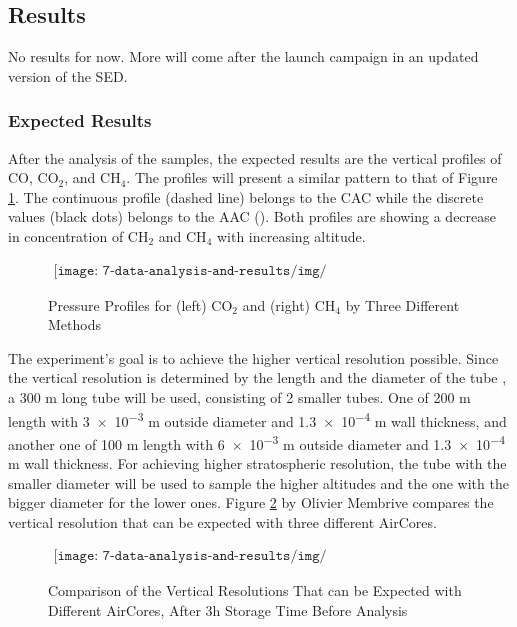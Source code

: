 \subsection{Results}

No results for now. More will come after the launch campaign in an updated version of the SED. 

\subsubsection{Expected Results}

After the analysis of the samples, the expected results are the vertical profiles of CO, CO$_2$, and CH$_4$. The profiles will present a similar pattern to that of Figure \ref{fig:vertical-profile-karion}. The continuous profile (dashed line) belongs to the CAC while the discrete values (black dots) belongs to the AAC (\cite{Karion}). Both profiles are showing a decrease in concentration of CH$_2$ and CH$_4$ with increasing altitude.
\begin{figure}[H]
    \begin{align*}
        \texttt{[image: 7-data-analysis-and-results/img/ExpectedVerticalProfilesKarion.png]}
    \end{align*}
    \caption{Pressure Profiles for (left) CO$_2$ and (right) CH$_4$ by Three Different Methods \cite{Karion}\label{fig:vertical-profile-karion}}
\end{figure}

The experiment's goal is to achieve the higher vertical resolution possible. Since the vertical resolution is determined by the length and the diameter of the tube \cite{Membrive}, a 300 m long tube will be used, consisting of 2 smaller tubes. One of 200 m length with \num{3e-3} m outside diameter and \num{1.3e-4} m wall thickness, and another one of 100 m length with \num{6e-3} m outside diameter and \num{1.3e-4} m wall thickness. For achieving higher stratospheric resolution, the tube with the smaller diameter will be used to sample the higher altitudes and the one with the bigger diameter for the lower ones.
Figure \ref{fig:resolution-lenght} by Olivier Membrive \cite{Membrive} compares the vertical resolution that can be expected with three different AirCores.

\begin{figure}[H]
    \begin{align*}
        \texttt{[image: 7-data-analysis-and-results/img/ResolutionVslength.png]}
    \end{align*}
    \caption{Comparison of the Vertical Resolutions That can be Expected with Different AirCores, After 3h Storage Time Before Analysis \cite{Membrive}\label{fig:resolution-lenght}}
\end{figure}

